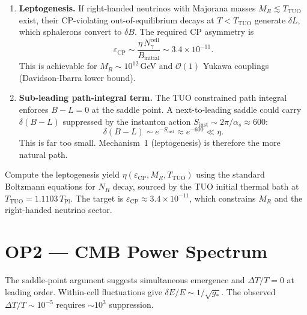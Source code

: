 \documentclass[12pt,a4paper]{article}
\theoremstyle{remark}
\newcommand{\TPl}{T_{\mathrm{Pl}}}
\newcommand{\gstar}{g_{*}}
\newcommand{\TTUO}{T_{\mathrm{TUO}}}
\begin{document}
\begin{enumerate}
  \item \textbf{Leptogenesis.} If right-handed neutrinos with Majorana
    masses $M_R \lesssim \TTUO$ exist, their CP-violating out-of-equilibrium
    decays at $T < \TTUO$ generate $\delta L$, which sphalerons convert to
    $\delta B$.  The required CP asymmetry is
    \[
      \varepsilon_\mathrm{CP} \sim \frac{\eta\,N_\gamma^\mathrm{cell}}{B_\mathrm{initial}}
      \sim 3.4\times10^{-11}.
    \]
    This is achievable for $M_R \sim 10^{12}$\,GeV and $\mathcal{O}(1)$
    Yukawa couplings (Davidson-Ibarra lower bound).

  \item \textbf{Sub-leading path-integral term.} The TUO constrained
    path integral enforces $B-L=0$ at the saddle point.  A next-to-leading
    saddle could carry $\delta(B-L)$ suppressed by the instanton action
    $S_\mathrm{inst} \sim 2\pi/\alpha_s \approx 600$:
    \[
      \delta(B-L) \sim e^{-S_\mathrm{inst}} \approx e^{-600} \ll \eta.
    \]
    This is far too small.  Mechanism~1 (leptogenesis) is therefore the
    more natural path.
\end{enumerate}

\begin{tcolorbox}[openbox,title={What closes OP1}]
Compute the leptogenesis yield $\eta(\varepsilon_\mathrm{CP}, M_R, T_\mathrm{TUO})$
using the standard Boltzmann equations for $N_R$ decay, sourced by the
TUO initial thermal bath at $\TTUO = 1.1103\,\TPl$.
The target is $\varepsilon_\mathrm{CP} \approx 3.4\times10^{-11}$,
which constrains $M_R$ and the right-handed neutrino sector.
\end{tcolorbox}

\section{OP2 --- CMB Power Spectrum}
\label{sec:op2}

\begin{tcolorbox}[opbox,title={Open Problem 2}]
The saddle-point argument suggests simultaneous emergence and
$\Delta T/T = 0$ at leading order.
Within-cell fluctuations give $\delta E/E \sim 1/\sqrt{\gstar}$.
The observed $\Delta T/T \sim 10^{-5}$ requires $\sim10^3$ suppression.
\end{tcolorbox}
\end{document}
